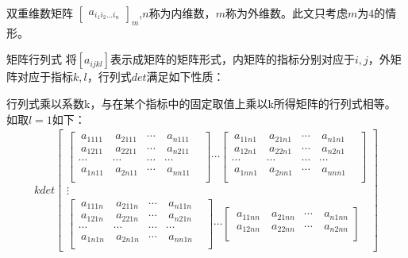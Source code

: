 \documentclass[twoside,a4paper,CCT]{cctart}   %
\begin{document}
\begin{define}\quad 双重维数矩阵
$\begin{bmatrix}
a_{i_{1}i_{2}...i_{n}}\end{bmatrix}_{m}$,$n$称为内维数，$m$称为外维数。此文只考虑$m$为4的情形。
\end{define}
\begin{define}\quad 矩阵行列式
将$[a_{ijkl}]$表示成矩阵的矩阵形式，内矩阵的指标分别对应于$i,j$，外矩阵对应于指标$k,l$，行列式$det$满足如下性质：

\begin{list}{}
{
\setlength{\rightmargin}{\leftmargin}}
\item
行列式乘以系数k，与在某个指标中的固定取值上乘以k所得矩阵的行列式相等。如取$l=1$如下：
\begin{align*}
k det
  \begin{bmatrix}
  \begin{bmatrix}
  \  a_{1111}&\  a_{2111}&\cdots&\  a_{n111}\\
 \  a_{1211}&\  a_{2211}&\cdots&\  a_{n211}\\
  \cdots&\cdots&\cdots &\cdots& \\
\  a_{1n11}&\  a_{2n11}&\cdots&\  a_{nn11}\\
 \end{bmatrix}
\cdots
\begin{bmatrix}
\  a_{11n1}&\  a_{21n1}&\cdots&\  a_{n1n1}\\
\  a_{12n1}&\  a_{22n1}&\cdots&\  a_{n2n1}\\
  \cdots&\cdots&\cdots &\cdots& \\
\  a_{1nn1}&\  a_{2nn1}&\cdots&\  a_{nnn1}\\
\end{bmatrix}\\
\vdots\\
\begin{bmatrix}
\  a_{111n}& \  a_{211n}&\cdots&\  a_{n11n}\\
\  a_{121n}& \  a_{221n}&\cdots&\  a_{n21n}\\
  \cdots&\cdots&\cdots &\cdots& \\
\  a_{1n1n}& \  a_{2n1n}&\cdots& \  a_{nn1n}\\
\end{bmatrix}
\cdots
\begin{bmatrix}
\  a_{11nn}& \  a_{21nn}&\cdots&\  a_{n1nn}\\
\  a_{12nn}& \  a_{22nn}&\cdots&\  a_{n2nn}\\

\end{bmatrix}
\end{bmatrix}
\end{align*}
\end{list}
\end{define}
\end{document}
